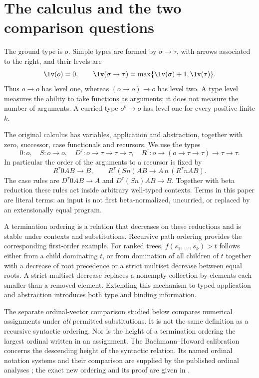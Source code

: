 \section{The calculus and the two comparison questions}\label{sec:calculus}

The ground type is $o$.  Simple types are formed by $\sigma\to\tau$,
with arrows associated to the right, and their levels are
\[
 \lv(o)=0,\qquad
 \lv(\sigma\to\tau)=\max\{\lv(\sigma)+1,\lv(\tau)\}.
\]
Thus $o\to o$ has level one, whereas $(o\to o)\to o$ has level two.
A type level measures the ability to take functions as arguments; it does
not measure the number of arguments.  A curried type $o^k\to o$ has
level one for every positive finite $k$.

The original calculus has variables, application and abstraction, together
with zero, successor, case functionals and recursors.  We use the types
\[
 0:o,\quad S:o\to o,\quad D^\tau:o\to\tau\to\tau\to\tau,
 \quad R^\tau:o\to(o\to\tau\to\tau)\to\tau\to\tau.
\]
In particular the order of the arguments to a recursor is fixed by
\[
 R^\tau0AB\longrightarrow B,\qquad
 R^\tau(Sn)AB\longrightarrow A\,n\,(R^\tau nAB).
\]
The case rules are $D^\tau0AB\to A$ and $D^\tau(Sn)AB\to B$.
Together with beta reduction these rules act inside arbitrary well-typed
contexts.  Terms in this paper are literal terms: an input is not first
beta-normalized, uncurried, or replaced by an extensionally equal program.

A termination ordering is a relation that decreases on these reductions
and is stable under contexts and substitutions.  Recursive path ordering
provides the corresponding first-order example.  For ranked trees,
$f(s_1,\ldots,s_k)>t$ follows either from a child dominating $t$, or from
domination of all children of $t$ together with a decrease of root precedence
or a strict multiset decrease between equal roots.  A strict multiset
decrease replaces a nonempty collection by elements each smaller than a
removed element.  Extending this mechanism to typed application and
abstraction introduces both type and binding information.

The separate ordinal-vector comparison studied below compares numerical
assignments under \emph{all} permitted substitutions.  It is not the same
definition as a recursive syntactic ordering.  Nor is the height of a
termination ordering the largest ordinal written in an assignment.
The Bachmann--Howard calibration concerns the descending height of the
syntactic relation.  Its named ordinal notation systems and their comparison
are supplied by the published ordinal analyses \cite{pohlers,simmons,simmonshelpful};
the exact new ordering and its proof are given in \cite{wwordering}.

